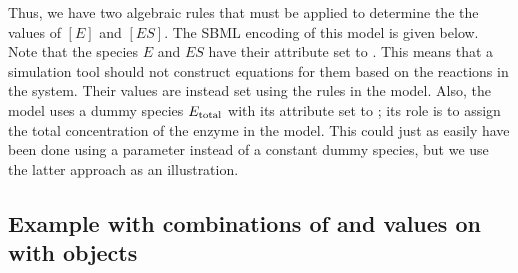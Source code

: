 Thus, we have two algebraic rules that must be applied to
determine the the values of $[E]$ and $[ES]$.  The SBML encoding
of this model is given below.  Note that the species $E$ and $ES$
have their  attribute set to .
This means that a simulation tool should not construct equations
for them based on the reactions in the system.  Their values are
instead set using the rules in the model.  Also, the model uses a
dummy species $E\sub{total}$ with its  attribute
set to ; its role is to assign the total concentration
of the enzyme in the model.  This could just as easily have been
done using a parameter instead of a constant dummy species, but we
use the latter approach as an illustration.



\subsection{Example with combinations of
   and  values on 
  with  objects}
\label{sec:constantspecieseg}

